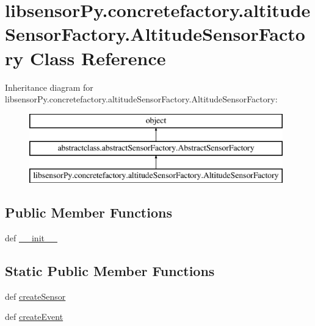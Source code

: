 \hypertarget{classlibsensorPy_1_1concretefactory_1_1altitudeSensorFactory_1_1AltitudeSensorFactory}{}\section{libsensor\+Py.\+concretefactory.\+altitude\+Sensor\+Factory.\+Altitude\+Sensor\+Factory Class Reference}
\label{classlibsensorPy_1_1concretefactory_1_1altitudeSensorFactory_1_1AltitudeSensorFactory}
Inheritance diagram for libsensor\+Py.\+concretefactory.\+altitude\+Sensor\+Factory.\+Altitude\+Sensor\+Factory\+:\begin{figure}[H]
\begin{center}
\leavevmode
\includegraphics[height=3.000000cm]{classlibsensorPy_1_1concretefactory_1_1altitudeSensorFactory_1_1AltitudeSensorFactory}
\end{center}
\end{figure}
\subsection*{Public Member Functions}
\begin{DoxyCompactItemize}
\item 
def \hyperlink{classlibsensorPy_1_1concretefactory_1_1altitudeSensorFactory_1_1AltitudeSensorFactory_a09dffbf83732080b6d3e7c7909e2c644}{\+\_\+\+\_\+init\+\_\+\+\_\+}
\end{DoxyCompactItemize}
\subsection*{Static Public Member Functions}
\begin{DoxyCompactItemize}
\item 
def \hyperlink{classlibsensorPy_1_1concretefactory_1_1altitudeSensorFactory_1_1AltitudeSensorFactory_af53dfcd13bf94d1fa5c2f252c2e72e2a}{create\+Sensor}
\item 
def \hyperlink{classlibsensorPy_1_1concretefactory_1_1altitudeSensorFactory_1_1AltitudeSensorFactory_a809c287c1cde96017ea9b4767ced382a}{create\+Event}
\end{DoxyCompactItemize}


